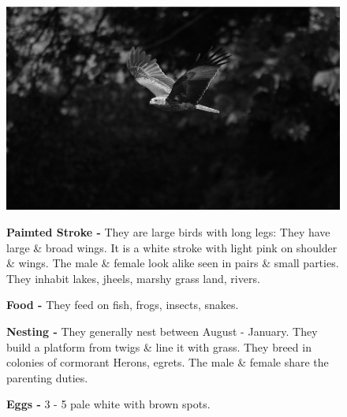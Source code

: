\begin{figure}[H]
\begin{center}
\includegraphics{figure/Land_birds/01_pariah_kite/pariah-kite.eps}
\end{center}
\medskip
\noindent
{\bf Paimted Stroke -} They are large birds with long legs: They have large \& broad wings. It is a white stroke with light pink on shoulder \& wings. The male \& female look alike seen in pairs \& small parties. They inhabit lakes, jheels, marshy grass land, rivers.

\medskip
{\bf Food -} They feed on fish, frogs, insects, snakes.

{\bf Nesting -} They generally nest between August - January. They build a platform from twigs \& line it with grass. They breed in colonies of cormorant Herons, egrets. The male \& female share the parenting duties.

{\bf Eggs -} 3 - 5 pale white with brown spots.
\end{figure}

\vfill\eject

~\phantom{a}
\vfill

